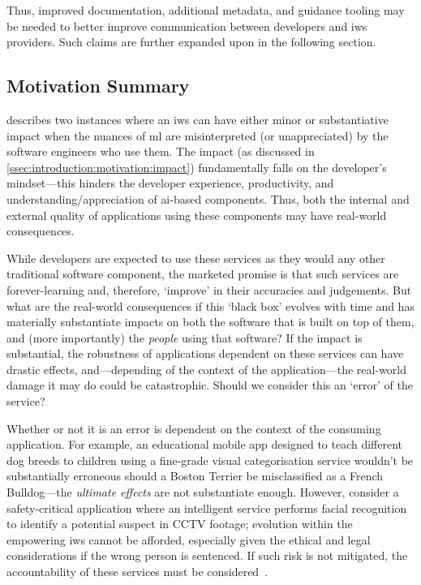 Thus, improved documentation, additional metadata, and guidance tooling may be needed to better improve communication between developers and \gls{iws} providers. Such claims are further expanded upon in the following section.

\subsection{Motivation Summary}

 describes two instances where an \gls{iws} can have either minor or substantiative impact when the nuances of \gls{ml} are misinterpreted (or unappreciated) by the software engineers who use them. The impact (as discussed in \cref{ssec:introduction:motivation:impact}) fundamentally falls on the developer's mindset---this hinders the developer experience, productivity, and understanding/appreciation of \gls{ai}-based components. Thus, both the internal and external quality of applications using these components may have real-world consequences.

While developers are expected to use these services as they would any other traditional software component, the marketed promise is that such services are forever-learning and, therefore, `improve' in their accuracies and judgements. But what are the real-world consequences if this `black box' evolves with time and has materially substantiate impacts on both the software that is built on top of them, and (more importantly) the \textit{people} using that software? If the impact is substantial, the robustness of applications dependent on these services can have drastic effects, and---depending of the context of the application---the real-world damage it may do could be catastrophic. Should we consider this an `error' of the service?

Whether or not it is an error is dependent on the context of the consuming application. For example, an educational mobile app designed to teach different dog breeds to children using a fine-grade visual categorisation service wouldn't be substantially erroneous should a Boston Terrier be misclassified as a French Bulldog---the \textit{ultimate effects} are not substantiate enough. However, consider a safety-critical application where an intelligent service performs facial recognition to identify a potential suspect in CCTV footage; evolution within the empowering \gls{iws} cannot be afforded, especially given the ethical and legal considerations if the wrong person is sentenced. If such risk is not mitigated, the accountability of these services must be considered~\citep{DoshiVelez:2017vm}.

